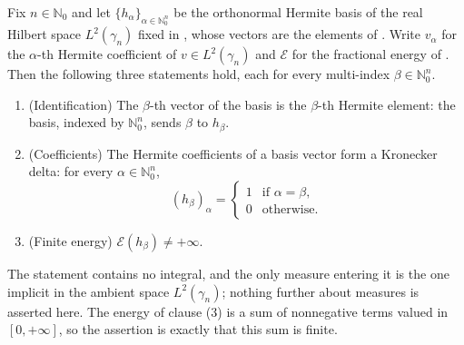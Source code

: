 \begin{lemma}
Fix $n \in \mathbb{N}_0$ and let $\{h_\alpha\}_{\alpha \in \mathbb{N}_0^n}$ be
the orthonormal Hermite basis of the real Hilbert space $L^2(\gamma_n)$ fixed in
, whose vectors are the elements of .
Write $v_\alpha$ for the $\alpha$-th Hermite coefficient of
$v \in L^2(\gamma_n)$ and $\mathcal{E}$ for the fractional energy of
.  Then the following three statements hold, each for every
multi-index $\beta \in \mathbb{N}_0^n$.
\begin{enumerate}
  \item (Identification) The $\beta$-th vector of the basis is the $\beta$-th
    Hermite element: the basis, indexed by $\mathbb{N}_0^n$, sends $\beta$ to
    $h_\beta$.
  \item (Coefficients) The Hermite coefficients of a basis vector form a
    Kronecker delta: for every $\alpha \in \mathbb{N}_0^n$,
    \[
      (h_\beta)_\alpha
        = \begin{cases} 1 & \text{if } \alpha = \beta, \\ 0 & \text{otherwise.}
          \end{cases}
    \]
  \item (Finite energy) $\mathcal{E}(h_\beta) \neq +\infty$.
\end{enumerate}
The statement contains no integral, and the only measure entering it is the one
implicit in the ambient space $L^2(\gamma_n)$; nothing further about measures is
asserted here.  The energy of clause (3) is a sum of nonnegative terms valued in
$[0,+\infty]$, so the assertion is exactly that this sum is finite.
\end{lemma}
